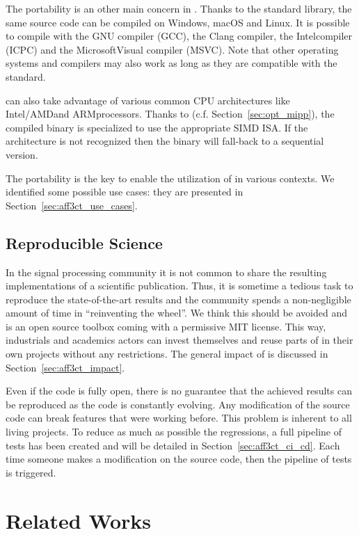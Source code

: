 The portability is an other main concern in \AFFECT. Thanks to the 
standard library, the same \AFFECT source code can be compiled on Windows, macOS
and Linux. It is possible to compile with the GNU compiler (GCC), the Clang
compiler, the Intel\R \Cxx compiler (ICPC) and the Microsoft\R Visual compiler
(MSVC). Note that other operating systems and compilers may also work as long as
they are compatible with the  standard.

\AFFECT can also take advantage of various common CPU architectures like
Intel\R/AMD\R and ARM\R processors. Thanks to \MIPP (c.f.
Section~\ref{sec:opt_mipp}), the compiled binary is specialized to use the
appropriate SIMD ISA. If the architecture is not recognized then the \AFFECT
binary will fall-back to a sequential version.

The portability is the key to enable the utilization of \AFFECT in various
contexts. We identified some possible use cases: they are presented in
Section~\ref{sec:aff3ct_use_cases}.

\subsection{Reproducible Science}

In the signal processing community it is not common to share the resulting
implementations of a scientific publication. Thus, it is sometime a tedious task
to reproduce the state-of-the-art results and the community spends a
non-negligible amount of time in ``reinventing the wheel''. We think this should
be avoided and \AFFECT is an open source toolbox coming with a permissive MIT
license. This way, industrials and academics actors can invest themselves and
reuse parts of \AFFECT in their own projects without any restrictions. The
general impact of \AFFECT is discussed in Section~\ref{sec:aff3ct_impact}.

Even if the code is fully open, there is no guarantee that the achieved results
can be reproduced as the code is constantly evolving. Any modification of the
source code can break features that were working before. This problem is
inherent to all living projects. To reduce as much as possible the regressions,
a full pipeline of tests has been created and will be detailed in
Section~\ref{sec:aff3ct_ci_cd}. Each time someone makes a modification on the
\AFFECT source code, then the pipeline of tests is triggered.

\section{Related Works}
\label{sec:aff3ct_related_works}

